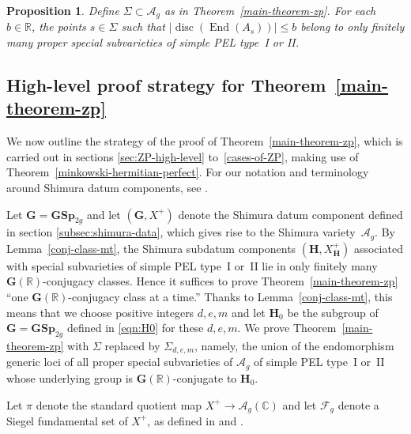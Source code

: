 \documentclass[JEP,XML,SOM,Unicode,NoFloatCountersInSection]{cedram}
\newcommand{\bC}{\mathbb{C}}
\newcommand{\bR}{\mathbb{R}}
\newcommand{\Ag}{\mathcal{A}_g}
\newcommand{\Fg}{\mathcal{F}_g}
\newcommand{\gG}{\mathbf{G}}
\newcommand{\gGSp}{\mathbf{GSp}}
\newcommand{\gH}{\mathbf{H}}
\DeclareMathOperator{\disc}{disc}
\DeclareMathOperator{\End}{End}
\newcommand{\abs}[1]{\lvert #1 \rvert}
\newtheorem{proposition}[lemma]{Proposition}
\begin{document}
\begin{proposition}\label{prop:finitely-many-intro}
Define $\Sigma \!\subset\! \Ag$ as in Theorem~\ref{main-theorem-zp}.
For each $b\in\bR$, the points \hbox{$s\!\in\!\Sigma$} such that $\abs{\disc(\End(A_s))} \leq b$ belong to only finitely many proper special subvarieties of simple PEL type~I or II.
\end{proposition}

\subsection{High-level proof strategy for Theorem~\ref{main-theorem-zp}} \label{subsec:proof-strategy-high-level}

We now outline the strategy of the proof of Theorem~\ref{main-theorem-zp}, which is carried out in sections \ref{sec:ZP-high-level} to~\ref{cases-of-ZP}, making use of Theorem~\ref{minkowski-hermitian-perfect}. For our notation and terminology around Shimura datum components, see \cite[\S\S 2.A \&~2.B]{ExCM}.

Let $\gG = \gGSp_{2g}$ and let $(\gG, X^+)$ denote the Shimura datum component defined in section \ref{subsec:shimura-data}, which gives rise to the Shimura variety~$\Ag$. By Lemma~\ref{conj-class-mt}, the Shimura subdatum components $(\gH, X_\gH^+)$ associated with special subvarieties of simple PEL type~I or~II lie in only finitely many $\gG(\bR)$-conjugacy classes. Hence it suffices to prove Theorem~\ref{main-theorem-zp} ``one $\gG(\bR)$-conjugacy class at a time.''
Thanks to Lemma~\ref{conj-class-mt}, this means that we choose positive integers $d,e,m$ and let $\gH_0$ be the subgroup of $\gG = \gGSp_{2g}$ defined in \eqref{eqn:H0} for these $d,e,m$.
We prove Theorem~\ref{main-theorem-zp} with $\Sigma$ replaced by $\Sigma_{d,e,m}$, namely, the union of the endomorphism generic loci of all proper special subvarieties of $\Ag$ of simple PEL type~I or~II whose underlying group is $\gG(\bR)$-conjugate to $\gH_0$.

Let $\pi$ denote the standard quotient map $X^+ \to \Ag(\bC)$ and let $\Fg$ denote a Siegel fundamental set of $X^+$, as defined in \cite[\S2]{Orr18} and \cite[\S2.G]{ExCM}.
\end{document}
